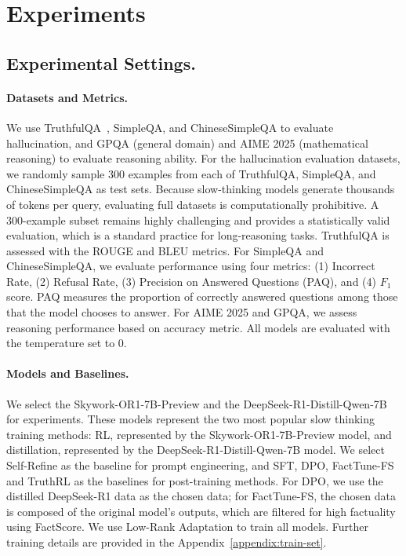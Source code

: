 \section{Experiments}
\subsection{Experimental Settings.}
\paragraph{Datasets and Metrics.}
We use TruthfulQA~\citep{lin2021truthfulqa}, SimpleQA, and ChineseSimpleQA to evaluate hallucination, and GPQA (general domain) and AIME 2025 (mathematical reasoning) to evaluate reasoning ability.
For the hallucination evaluation datasets, we randomly sample 300 examples from each of TruthfulQA, SimpleQA, and ChineseSimpleQA as test sets.
Because slow-thinking models generate thousands of tokens per query, evaluating full datasets is computationally prohibitive.
A 300-example subset remains highly challenging and provides a statistically valid evaluation, which is a standard practice for long-reasoning tasks.
TruthfulQA is assessed with the ROUGE and BLEU metrics.
For SimpleQA and ChineseSimpleQA, we evaluate performance using four metrics: (1) Incorrect Rate, (2) Refusal Rate, (3) Precision on Answered Questions (PAQ), and (4) $F_1$ score.
PAQ measures the proportion of correctly answered questions among those that the model chooses to answer.
For AIME 2025 and GPQA, we assess reasoning performance based on accuracy metric.
All models are evaluated with the temperature set to 0.


\paragraph{Models and Baselines.}
We select the Skywork-OR1-7B-Preview \citep{skywork-or1-2025} and the DeepSeek-R1-Distill-Qwen-7B for experiments. 
These models represent the two most popular slow thinking training methods: RL, represented by the Skywork-OR1-7B-Preview model, and distillation, represented by the DeepSeek-R1-Distill-Qwen-7B model. 
We select Self-Refine \citep{madaan2023self} as the baseline for prompt engineering, and SFT, DPO, FactTune-FS \citep{tian2023fine} and TruthRL \citep{wei2025truthrl} as the baselines for post-training methods. 
For DPO, we use the distilled DeepSeek-R1 data as the chosen data; for FactTune-FS, the chosen data is composed of the original model's outputs, which are filtered for high factuality using FactScore. 
We use Low-Rank Adaptation \citep[LoRA;][]{hu2022lora} to train all models. Further training details are provided in the Appendix~\ref{appendix:train-set}.

